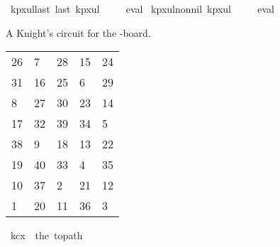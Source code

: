 \begin{isabellebody}
{\isafoldproof}%
%
\isadelimproof
%
\endisadelimproof
\isanewline
\isanewline
{}\isamarkupfalse%
\ kp{\isacharunderscore}{\kern0pt}{}x{}{\isacharunderscore}{\kern0pt}ul{\isacharunderscore}{\kern0pt}last{\isacharcolon}{\kern0pt}\ {\isachardoublequoteopen}last\ kp{}x{}ul\ {\isacharequal}{\kern0pt}\ {\isacharparenleft}{\kern0pt}{}{\isacharcomma}{\kern0pt}{}{\isacharparenright}{\kern0pt}{\isachardoublequoteclose}%
\isadelimproof
\ %
\endisadelimproof
%
\isatagproof
{}\isamarkupfalse%
\ eval%
\endisatagproof
{\isafoldproof}%
%
\isadelimproof
%
\endisadelimproof
\isanewline
\isanewline
{}\isamarkupfalse%
\ kp{\isacharunderscore}{\kern0pt}{}x{}{\isacharunderscore}{\kern0pt}ul{\isacharunderscore}{\kern0pt}non{\isacharunderscore}{\kern0pt}nil{\isacharcolon}{\kern0pt}\ {\isachardoublequoteopen}kp{}x{}ul\ {\isasymnoteq}\ {\isacharbrackleft}{\kern0pt}{\isacharbrackright}{\kern0pt}{\isachardoublequoteclose}%
\isadelimproof
\ %
\endisadelimproof
%
\isatagproof
{}\isamarkupfalse%
\ eval%
\endisatagproof
{\isafoldproof}%
%
\isadelimproof
%
\endisadelimproof
%
\begin{isamarkuptext}%
A Knight's circuit for the -board.
  \begin{table}[H]
    \begin{tabular}{lllll}
      26 &  7 & 28 & 15 & 24 \\
      31 & 16 & 25 &  6 & 29 \\
       8 & 27 & 30 & 23 & 14 \\
      17 & 32 & 39 & 34 &  5 \\
      38 &  9 & 18 & 13 & 22 \\
      19 & 40 & 33 &  4 & 35 \\
      10 & 37 &  2 & 21 & 12 \\
       1 & 20 & 11 & 36 &  3
    \end{tabular}
  \end{table}%
\end{isamarkuptext}\isamarkuptrue%
\isamarkupfalse%
\ {\isachardoublequoteopen}kc{}x{}\ {\isasymequiv}\ the\ {\isacharparenleft}{\kern0pt}to{\isacharunderscore}{\kern0pt}path\ \isanewline
\ \ {\isacharbrackleft}{\kern0pt}{\isacharbrackleft}{\kern0pt}{}{}{\isacharcomma}{\kern0pt}{}{\isacharcomma}{\kern0pt}{}{}{\isacharcomma}{\kern0pt}{}{}{\isacharcomma}{\kern0pt}{}{}{\isacharbrackright}{\kern0pt}{\isacharcomma}{\kern0pt}\isanewline

\end{isabellebody}
